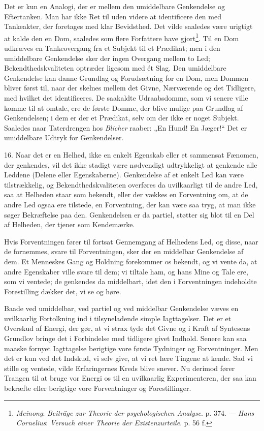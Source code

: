 \documentclass[12pt,a4paper]{book}
\newcommand{\opage}[1]{\marginnote{\footnotesize\textit{[#1]}}}
\newcommand{\apage}[1]{\marginnote{\footnotesize\textit{[#1]}}}
\begin{document}
Det er kun en Analogi, der er mellem den umiddelbare \apage{50} Genkendelse og
Eftertanken. Man har ikke Ret til uden videre at identificere den med
Tankeakter, der foretages med klar Bevidsthed. Det vilde saaledes være
urigtigt at kalde den en Dom, saaledes som flere Forfattere have
gjort\footnote{\emph{Meinong}: \emph{Beiträge zur Theorie der
psychologischen Analyse}. p. 374. --- \emph{Hans Cornelius}: \emph{Versuch
einer Theorie der Existenzurteile}. p. 56 f.}. Til en Dom udkræves en
Tankeovergang fra et Subjekt til et Prædikat; men i den umiddelbare
Genkendelse sker der ingen Overgang mellem to Led; Bekendthedskvaliteten
optræder ligesom med ét Slag. Den umiddelbare Genkendelse kan danne
Grundlag og Forudsætning for en Dom, men Dommen bliver først til, naar
der skelnes mellem det Givne, Nærværende og det Tidligere, med hvilket
det identificeres. De saakaldte Udraabsdomme, som vi senere ville komme
til at omtale, ere de første Domme, der blive mulige paa Grundlag af
Genkendelsen; i dem er der et Prædikat, selv om der ikke er noget
Subjekt. Saaledes naar Taterdrengen hos \emph{Blicher} raaber: „En Hund!
En Jæger!“ Det er umiddelbare Udtryk for Genkendelser.

16. Naar det er en Helhed, ikke en enkelt Egenskab eller et sammensat
Fænomen, der genkendes, vil det ikke stadigt være nødvendigt udtrykkeligt
at genkende alle Leddene (Delene eller Egenskaberne). Genkendelse af et
enkelt Led kan være tilstrækkelig, og Bekendthedskvaliteten overføres da
uvilkaarligt til de andre Led, saa at Helheden staar som bekendt, eller
der vækkes en Forventning om, at de andre Led ogsaa ere tilstede, en
Forventning, der kan være saa tryg, at man ikke søger Bekræftelse paa
den. Genkendelsen er da partiel, støtter sig blot til en Del af Helheden,
der tjener som Kendemærke.

Hvis Forventningen fører til fortsat Gennemgang af Helhedens Led, og
disse, naar de fornemmes, svare til Forventningen, sker der en middelbar
Genkendelse af dem. Et Menneskes Gang og Holdning forekommer os bekendt,
og vi vente da, at andre Egenskaber ville svare til dem; vi tiltale ham,
og hans Mine og Tale ere, som vi ventede; de genkendes da middelbart,
idet den i Forventningen indeholdte Forestilling dækker det, vi se og
høre.

\opage{51} Baade ved umiddelbar, ved partiel og ved middelbar Genkendelse væves en
uvilkaarlig Fortolkning ind i tilsyneladende simple Iagttagelser. Det er
et Overskud af Energi, der gør, at vi strax tyde det Givne og i Kraft af
Syntesens Grundlov bringe det i Forbindelse med tidligere givet Indhold.
Senere kan saa maaske fornyet Iagttagelse berigtige vore første
Tydninger og Forventninger. Men det er kun ved det Indskud, vi selv
give, at vi ret lære Tingene at kende. Sad vi stille og ventede, vilde
Erfaringernes Kreds blive snever. Nu derimod fører Trangen til at bruge
vor Energi os til en uvilkaarlig Experimenteren, der saa kan bekræfte
eller berigtige vore Forventninger og Forestillinger.
\end{document}
